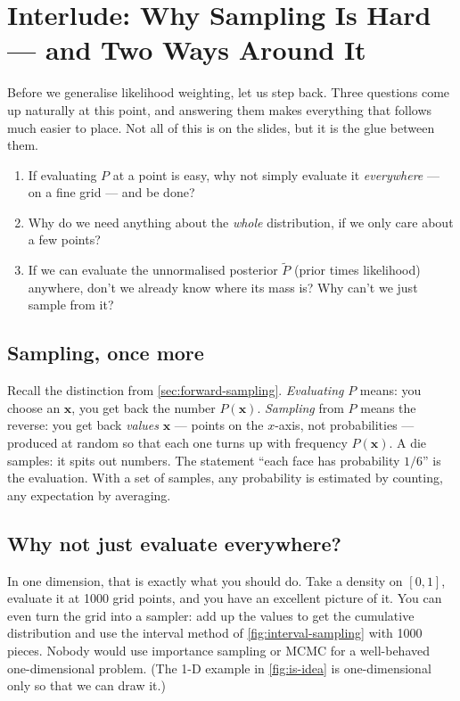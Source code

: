 \documentclass[11pt, oneside]{book}
\newcommand{\bx}{\mathbf{x}}  \newcommand{\by}{\mathbf{y}}
\let\originalsection\section
\renewcommand{\section}{\Needspace{7\baselineskip}\originalsection}
\let\originalsubsection\subsection
\renewcommand{\subsection}{\Needspace{6\baselineskip}\originalsubsection}
\begin{document}
\section{Interlude: Why Sampling Is Hard --- and Two Ways Around It}
\label{sec:why-sampling-hard}

Before we generalise likelihood weighting, let us step back. Three questions
come up naturally at this point, and answering them makes everything that
follows much easier to place. Not all of this is on the slides, but it is the
glue between them.
\begin{enumerate}
  \item If evaluating $P$ at a point is easy, why not simply evaluate it
    \emph{everywhere} --- on a fine grid --- and be done?
  \item Why do we need anything about the \emph{whole} distribution, if we
    only care about a few points?
  \item If we can evaluate the unnormalised posterior $\tilde P$ (prior times
    likelihood) anywhere, don't we already know where its mass is? Why can't
    we just sample from it?
\end{enumerate}

\subsection{Sampling, once more}

Recall the distinction from \cref{sec:forward-sampling}. \emph{Evaluating}
$P$ means: you choose an $\bx$, you get back the number $P(\bx)$.
\emph{Sampling} from $P$ means the reverse: you get back \emph{values} $\bx$ ---
points on the $x$-axis, not probabilities --- produced at random so that each
one turns up with frequency $P(\bx)$. A die samples: it spits out numbers. The
statement ``each face has probability $1/6$'' is the evaluation. With a set of
samples, any probability is estimated by counting, any expectation by
averaging.

\subsection{Why not just evaluate everywhere?}

In one dimension, that is exactly what you should do. Take a density on
$[0, 1]$, evaluate it at 1000 grid points, and you have an excellent picture of
it. You can even turn the grid into a sampler: add up the values to get the
cumulative distribution and use the interval method of
\cref{fig:interval-sampling} with 1000 pieces. Nobody would use importance
sampling or MCMC for a well-behaved one-dimensional problem. (The 1-D example
in \cref{fig:is-idea} is one-dimensional only so that we can draw it.)
\end{document}
